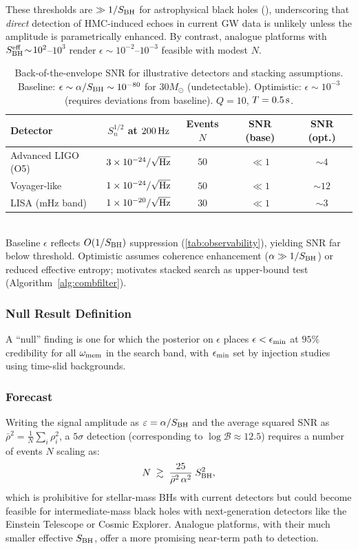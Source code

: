 \documentclass[aps,prd,preprint,onecolumn,superscriptaddress,nofootinbib,longbibliography,floatfix,11pt,showpacs,showkeys]{revtex4-2}
\newcommand{\HMC}{\textsc{HMC}\xspace}
\theoremstyle{plain}
\theoremstyle{definition}
\theoremstyle{remark}
\begin{document}
These thresholds are $\gg 1/S_{\rm BH}$ for astrophysical black holes (), underscoring that \emph{direct} detection of \HMC{}-induced echoes in current GW data is unlikely unless the amplitude is parametrically enhanced. 
By contrast, analogue platforms with $S_{\rm BH}^{\rm eff}\!\sim\!10^2$--$10^3$ render $\epsilon\sim 10^{-2}$--$10^{-3}$ feasible with modest $N$.

\begin{table}[t]
\centering
\caption{Back-of-the-envelope SNR for illustrative detectors and stacking assumptions. Baseline: $\epsilon\sim \alpha/S_{\rm BH}\sim 10^{-80}$ for $30M_\odot$ (undetectable). Optimistic: $\epsilon\sim 10^{-3}$ (requires deviations from baseline). $Q=10$, $T=0.5\,{\rm s}$.}
\label{tab:snr}
\small
\begin{tabular}{lcccc}
\hline
Detector & $S_n^{1/2}$ at $200\,{\rm Hz}$ & Events $N$ & SNR (base) & SNR (opt.) \\
\hline
Advanced LIGO (O5) & $3\times 10^{-24}/\sqrt{\rm Hz}$ & $50$ & $\ll 1$ & $\sim 4$ \\
Voyager-like & $1\times 10^{-24}/\sqrt{\rm Hz}$ & $50$ & $\ll 1$ & $\sim 12$ \\
LISA (mHz band) & $1\times 10^{-20}/\sqrt{\rm Hz}$ & $30$ & $\ll 1$ & $\sim 3$ \\
\hline
\end{tabular}
\\[0.5em]
\small Baseline $\epsilon$ reflects $O(1/S_{\rm BH})$ suppression (\cref{tab:observability}), yielding SNR far below threshold. Optimistic assumes coherence enhancement ($\alpha\gg 1/S_{\rm BH}$) or reduced effective entropy; motivates stacked search as upper-bound test (Algorithm~\ref{alg:combfilter}).
\end{table}
\subsubsection{Null Result Definition}
A ``null'' finding is one for which the posterior on $\epsilon$ places $\epsilon<\epsilon_{\rm min}$ at $95\%$ credibility for all $\omega_{\rm mem}$ in the search band,
with $\epsilon_{\rm min}$ set by injection studies using time-slid backgrounds.

\subsubsection{Forecast} Writing the signal amplitude as $\varepsilon=\alpha/S_{\rm BH}$ and the average squared SNR as $\bar{\rho}^2=\frac{1}{N}\sum_i \rho_i^2$, a $5\sigma$ detection (corresponding to $\log\mathcal{B} \approx 12.5$) requires a number of events $N$ scaling as:
\begin{equation}
N \;\gtrsim\; \frac{25}{\bar{\rho}^2\,\alpha^2}\; S_{\rm BH}^2,
\end{equation}
which is prohibitive for stellar-mass BHs with current detectors but could become feasible for intermediate-mass black holes with next-generation detectors like the Einstein Telescope or Cosmic Explorer. Analogue platforms, with their much smaller effective $S_{\rm BH}$, offer a more promising near-term path to detection.
\end{document}
